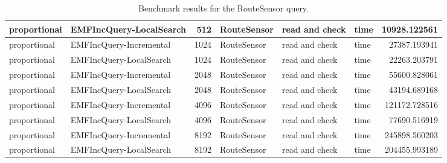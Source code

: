 \begin{table}
\begin{tabular}{| l | l | r | l | l | l | r |}
proportional & EMFIncQuery-LocalSearch & 512 & RouteSensor & read and check & time & 10928.122561\\\hline
proportional & EMFIncQuery-Incremental & 1024 & RouteSensor & read and check & time & 27387.193941\\\hline
proportional & EMFIncQuery-LocalSearch & 1024 & RouteSensor & read and check & time & 22263.203791\\\hline
proportional & EMFIncQuery-Incremental & 2048 & RouteSensor & read and check & time & 55600.828061\\\hline
proportional & EMFIncQuery-LocalSearch & 2048 & RouteSensor & read and check & time & 43194.689168\\\hline
proportional & EMFIncQuery-Incremental & 4096 & RouteSensor & read and check & time & 121172.728516\\\hline
proportional & EMFIncQuery-LocalSearch & 4096 & RouteSensor & read and check & time & 77690.516919\\\hline
proportional & EMFIncQuery-Incremental & 8192 & RouteSensor & read and check & time & 245898.560203\\\hline
proportional & EMFIncQuery-LocalSearch & 8192 & RouteSensor & read and check & time & 204455.993189\\\hline

\end{tabular}\caption{Benchmark results for the \textsf{RouteSensor} query.}
\label{tab:first-validation-routesensor}
\end{table}
